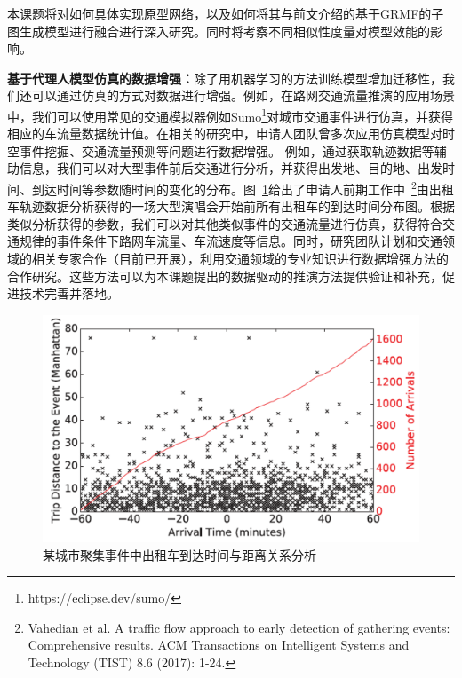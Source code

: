 \documentclass[12pt,UTF8,AutoFakeBold=2,a4paper]{ctexart} %
\begin{document}
本课题将对如何具体实现原型网络，以及如何将其与前文介绍的基于GRMF的子图生成模型进行融合进行深入研究。同时将考察不同相似性度量对模型效能的影响。

\textbf{基于代理人模型仿真的数据增强：}除了用机器学习的方法训练模型增加迁移性，我们还可以通过仿真的方式对数据进行增强。例如，在路网交通流量推演的应用场景中，我们可以使用常见的交通模拟器例如Sumo\footnote{https://eclipse.dev/sumo/}对城市交通事件进行仿真，并获得相应的车流量数据统计值。在相关的研究中，申请人团队曾多次应用仿真模型对时空事件挖掘、交通流量预测等问题进行数据增强。%
例如，通过获取轨迹数据等辅助信息，我们可以对大型事件前后交通进行分析，并获得出发地、目的地、出发时间、到达时间等参数随时间的变化的分布。图~\ref{fig:event-simu}给出了申请人前期工作中~\footnote{\footnotesize Vahedian et al. A traffic flow approach to early detection of gathering events: Comprehensive results. ACM Transactions on Intelligent Systems and Technology (TIST) 8.6 (2017): 1-24.}由出租车轨迹数据分析获得的一场大型演唱会开始前所有出租车的到达时间分布图。根据类似分析获得的参数，我们可以对其他类似事件的交通流量进行仿真，获得符合交通规律的事件条件下路网车流量、车流速度等信息。同时，研究团队计划和交通领域的相关专家合作（目前已开展），利用交通领域的专业知识进行数据增强方法的合作研究。这些方法可以为本课题提出的数据驱动的推演方法提供验证和补充，促进技术完善并落地。
\begin{figure}
    \centering
    \includegraphics[width=0.5\linewidth]{fig/event_simu.png}
    \caption{某城市聚集事件中出租车到达时间与距离关系分析}
    \label{fig:event-simu}
\end{figure}
\end{document}
